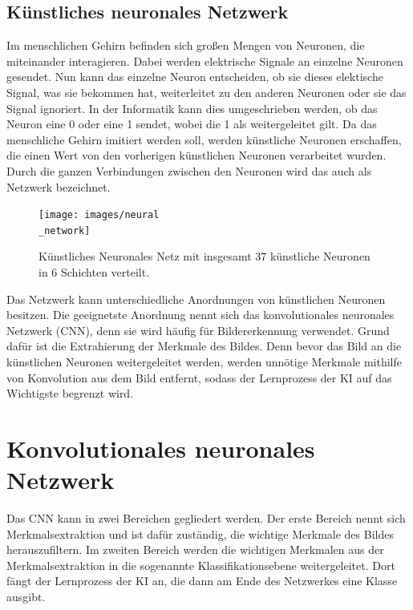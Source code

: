 \documentclass[11pt]{article}
\begin{document}
\subsection{Künstliches neuronales Netzwerk}
Im menschlichen Gehirn befinden sich großen Mengen von Neuronen, die miteinander interagieren. Dabei werden elektrische Signale an einzelne Neuronen
gesendet. Nun kann das einzelne Neuron entscheiden, ob sie dieses elektische Signal, was sie bekommen hat, weiterleitet zu den anderen Neuronen
oder sie das Signal ignoriert. In der Informatik kann dies umgeschrieben werden, ob das Neuron eine 0 oder eine 1 sendet, wobei die 1 als weitergeleitet gilt.
Da das menschliche Gehirn imitiert werden soll, werden künstliche Neuronen erschaffen, die einen Wert von den vorherigen künstlichen Neuronen verarbeitet wurden.
Durch die ganzen Verbindungen zwischen den Neuronen wird das auch als Netzwerk bezeichnet.
\begin{figure}[h]
    \centering
    \texttt{[image: images/neural\\\_network]}
    \caption{Künstliches Neuronales Netz mit insgesamt 37 künstliche Neuronen in 6 Schichten verteilt.}
\end{figure}
Das Netzwerk kann unterschiedliche Anordnungen von künstlichen Neuronen besitzen. Die geeignetste Anordnung nennt sich das
konvolutionales neuronales Netzwerk (CNN), denn sie wird häufig für Bildererkennung verwendet. Grund dafür ist die Extrahierung der Merkmale
des Bildes. Denn bevor das Bild an die künstlichen Neuronen weitergeleitet werden, werden unnötige Merkmale mithilfe von Konvolution aus dem Bild entfernt, sodass der
Lernprozess der KI auf das Wichtigste begrenzt wird.

\section{Konvolutionales neuronales Netzwerk}

Das CNN kann in zwei Bereichen gegliedert werden. Der erste Bereich nennt sich
Merkmalsextraktion und ist dafür zuständig, die wichtige Merkmale des Bildes herauszufiltern. Im zweiten Bereich werden die
wichtigen Merkmalen aus der Merkmalsextraktion in die sogenannte Klassifikationsebene weitergeleitet. Dort fängt der Lernprozess
der KI an, die dann am Ende des Netzwerkes eine Klasse ausgibt.
\end{document}
